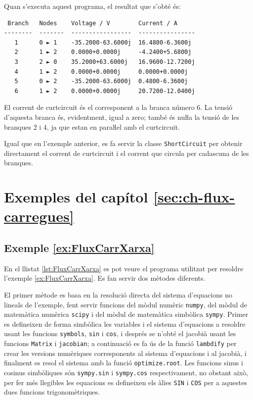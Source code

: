Quan s'executa aquest programa, el resultat que s'obté és:
\lstset{
	language=,
	numbers=none,
	frame=none
}
\begin{lstlisting}
 Branch   Nodes    Voltage / V        Current / A
--------  -------  -----------------  ----------------
   1      0 ► 1    -35.2000-63.6000j  16.4800-6.3600j
   2      1 ► 2    0.0000+0.0000j     -4.2400+5.6800j
   3      2 ► 0    35.2000+63.6000j   16.9600-12.7200j
   4      1 ► 2    0.0000+0.0000j     0.0000+0.0000j
   5      0 ► 2    -35.2000-63.6000j  0.4800-6.3600j
   6      1 ► 2    0.0000+0.0000j     20.7200-12.0400j
\end{lstlisting}

El corrent de curtcircuit és el corresponent a la branca número 6. La tensió d'aquesta branca és, evidentment, igual a zero; també és nuŀla la tensió de les branques 2 i 4, ja que estan en paraŀlel amb el curtcircuit.

Igual que en l'exemple anterior, es fa servir la classe   \texttt{ShortCircuit} per obtenir directament el corrent de curtcircuit i el corrent que circula per cadascuna de les branques.


\section{Exemples del capítol \ref*{sec:ch-flux-carregues}}

\hypertarget{exemple:FluxCarrXarxa}{\subsection{Exemple \ref*{ex:FluxCarrXarxa} \FluxCarrXarxa}}
En el llistat \vref{lst:FluxCarrXarxa} es pot veure el programa utilitzat per resoldre l'exemple \vref{ex:FluxCarrXarxa}. Es fan servir dos mètodes diferents.

El primer mètode es basa en la resolució directa del sistema d'equacions no lineals de l'exemple, fent servir funcions del mòdul numèric \texttt{numpy}, del mòdul de matemàtica numèrica \texttt{scipy} i del mòdul de matemàtica simbòlica \texttt{sympy}. Primer es defineixen de forma simbòlica les variables i el sistema d'equacions a resoldre usant les funcions \texttt{symbols}, \texttt{sin} i \texttt{cos}, i després se n'obté el jacobià usant les funcions \texttt{Matrix} i \texttt{jacobian}; a continuació es fa ús de la funció  \texttt{lambdify} per crear les versions numèriques corresponents al sistema d'equacions i al jacobià, i finalment es resol el sistema amb la funció \texttt{optimize.root}. Les funcions sinus i cosinus simbòliques són  \texttt{sympy.sin} i  \texttt{sympy.cos} respectivament, no obstant això,  per fer més llegibles les equacions es defineixen els àlies \texttt{SIN} i \texttt{COS} per a aquestes dues funcions trigonomètriques.

